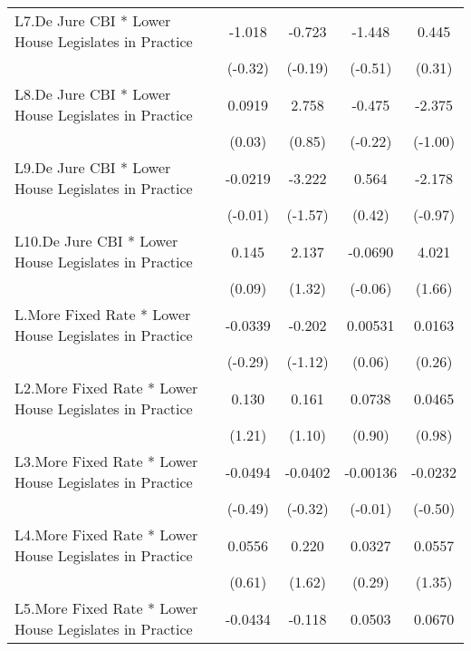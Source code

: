 {\begin{longtable}{l*{4}{c}}
\addlinespace
L7.De Jure CBI * Lower House Legislates in Practice&   -1.018         &   -0.723         &   -1.448         &    0.445         \\
                &  (-0.32)         &  (-0.19)         &  (-0.51)         &   (0.31)         \\
\addlinespace
L8.De Jure CBI * Lower House Legislates in Practice&   0.0919         &    2.758         &   -0.475         &   -2.375         \\
                &   (0.03)         &   (0.85)         &  (-0.22)         &  (-1.00)         \\
\addlinespace
L9.De Jure CBI * Lower House Legislates in Practice&  -0.0219         &   -3.222         &    0.564         &   -2.178         \\
                &  (-0.01)         &  (-1.57)         &   (0.42)         &  (-0.97)         \\
\addlinespace
L10.De Jure CBI * Lower House Legislates in Practice&    0.145         &    2.137         &  -0.0690         &    4.021         \\
                &   (0.09)         &   (1.32)         &  (-0.06)         &   (1.66)         \\
\addlinespace
L.More Fixed Rate * Lower House Legislates in Practice&  -0.0339         &   -0.202         &  0.00531         &   0.0163         \\
                &  (-0.29)         &  (-1.12)         &   (0.06)         &   (0.26)         \\
\addlinespace
L2.More Fixed Rate * Lower House Legislates in Practice&    0.130         &    0.161         &   0.0738         &   0.0465         \\
                &   (1.21)         &   (1.10)         &   (0.90)         &   (0.98)         \\
\addlinespace
L3.More Fixed Rate * Lower House Legislates in Practice&  -0.0494         &  -0.0402         & -0.00136         &  -0.0232         \\
                &  (-0.49)         &  (-0.32)         &  (-0.01)         &  (-0.50)         \\
\addlinespace
L4.More Fixed Rate * Lower House Legislates in Practice&   0.0556         &    0.220         &   0.0327         &   0.0557         \\
                &   (0.61)         &   (1.62)         &   (0.29)         &   (1.35)         \\
\addlinespace
L5.More Fixed Rate * Lower House Legislates in Practice&  -0.0434         &   -0.118         &   0.0503         &   0.0670         \\

\end{longtable}}
